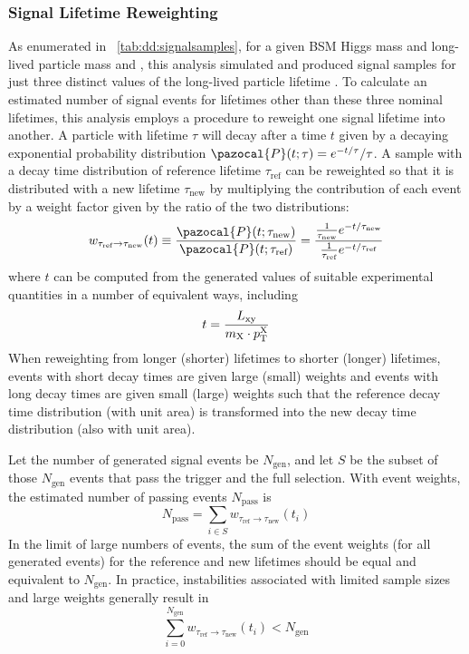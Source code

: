 \subsubsection{Signal Lifetime Reweighting}
\label{sec:dd:lifetimereweighting}
As enumerated in \Tab~\ref{tab:dd:signalsamples}, for a given BSM Higgs mass and long-lived particle mass \mH and \mX, this analysis simulated and produced signal samples for just three distinct values of the long-lived particle lifetime \cTau.
To calculate an estimated number of signal events for lifetimes other than these three nominal lifetimes, this analysis employs a procedure to reweight one signal lifetime into another.
A particle with lifetime $\tau$ will decay after a time $t$ given by a decaying exponential probability distribution $\pazocal{P}(t; \tau) = e^{-t/\tau}/\tau$.
A sample with a decay time distribution of reference lifetime $\tau_\text{ref}$ can be reweighted so that it is distributed with a new lifetime $\tau_\text{new}$ by multiplying the contribution of each event by a weight factor given by the ratio of the two distributions:
\begin{equation}
  w_{\tau_\text{ref}\to\tau_\text{new}}(t) \equiv \frac{\pazocal{P}(t; \tau_\text{new})}{\pazocal{P}(t; \tau_\text{ref})} = \frac{\frac{1}{\tau_\text{new}}e^{-t/\tau_\text{new}}}{\frac{1}{\tau_\text{ref}}e^{-t/\tau_\text{ref}}}
  \label{eq:dd:lifetimereweight}
\end{equation}
where $t$ can be computed from the generated values of suitable experimental quantities in a number of equivalent ways, including
\begin{equation}
  t = \frac{L_{\mathrm{xy}}}{m_{\mathrm{X}} \cdot p_{\mathrm{T}}^{\mathrm{X}}}
  \label{eq:dd:decaytime}
\end{equation}
When reweighting from longer (shorter) lifetimes to shorter (longer) lifetimes, events with short decay times are given large (small) weights and events with long decay times are given small (large) weights such that the reference decay time distribution (with unit area) is transformed into the new decay time distribution (also with unit area).

Let the number of generated signal events be $N_\text{gen}$, and let $S$ be the subset of those $N_\text{gen}$ events that pass the trigger and the full selection.
With event weights, the estimated number of passing events $N_\text{pass}$ is
\begin{equation}
  N_\text{pass} = \sum_{i\in S}{w_{\tau_\text{ref}\to\tau_\text{new}}(t_i)}
  \label{eq:dd:npass}
\end{equation}
In the limit of large numbers of events, the sum of the event weights (for all generated events) for the reference and new lifetimes should be equal and equivalent to $N_\text{gen}$.
In practice, instabilities associated with limited sample sizes and large weights generally result in
\begin{equation}
  \sum_{i = 0}^{N_\text{gen}}{w_{\tau_\text{ref}\to\tau_\text{new}}(t_i)} < N_\text{gen}
\end{equation}

